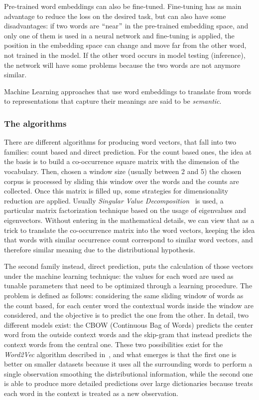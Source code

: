 Pre-trained word embeddings can also be fine-tuned. Fine-tuning has as main advantage to reduce the loss on the desired task, but can also have some disadvantages: if two words are $``$near$"$  in the pre-trained embedding space, and only one of them is used in a neural network and fine-tuning is applied, the position in the embedding space can change and move far from the other word, not trained in the model. If the other word occurs in model testing (inference), the network will have some problems because the two words are not anymore similar.

Machine Learning approaches that use word embeddings to translate from words to representations that capture their meanings are said to be \textit{semantic}.

\subsubsection{The algorithms}
There are different algorithms for producing word vectors, that fall into two families: count based and direct prediction. For the count based ones, the idea at the basis is to build a co-occurrence square matrix with the dimension of the vocabulary. Then, chosen a window size (usually between 2 and 5) the chosen corpus is processed by sliding this window over the words and the counts are collected. Once this matrix is filled up, some strategies for dimensionality reduction are applied. Usually \textit{Singular Value Decomposition~\cite{golub1970singular}} is used, a particular matrix factorization technique based on the usage of eigenvalues and eigenvectors. Without entering in the mathematical details, we can view that as a trick to translate the co-occurrence matrix into the word vectors, keeping the idea that words with similar occurrence count correspond to similar word vectors, and therefore similar meaning due to the distributional hypothesis.

The second family instead, direct prediction, puts the calculation of those vectors under the machine learning technique: the values for each word are used as tunable parameters that need to be optimized through a learning procedure. The problem is defined as follows: considering the same sliding window of words as the count based, for each center word the contextual words inside the window are considered, and the objective is to predict the one from the other. In detail, two different models exist: the CBOW (Continuous Bag of Words) predicts the center word from the outside context words and the skip-gram that instead predicts the context words from the central one. These two possibilities exist for the \textit{Word2Vec }algorithm described in~\cite{mikolov2013efficient}, and what emerges is that the first one is better on smaller datasets because it uses all the surrounding words to perform a single observation smoothing the distributional information, while the second one is able to produce more detailed predictions over large dictionaries because treats each word in the context is treated as a new observation.

